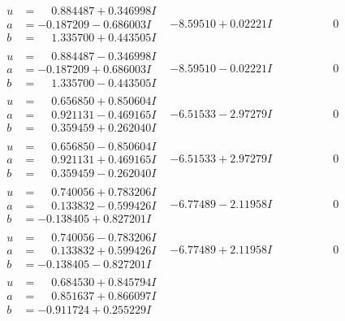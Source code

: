 \documentclass[1p]{elsarticle_modified}
\theoremstyle{definition}
\begin{document}
$$\begin{array}{c|c|c}
\begin{aligned}
u &= \phantom{-}0.884487 + 0.346998 I \\
a &= -0.187209 - 0.686003 I \\
b &= \phantom{-}1.335700 + 0.443505 I\end{aligned}
 & -8.59510 + 0.02221 I & \phantom{-0.000000 } 0 \\ \hline\begin{aligned}
u &= \phantom{-}0.884487 - 0.346998 I \\
a &= -0.187209 + 0.686003 I \\
b &= \phantom{-}1.335700 - 0.443505 I\end{aligned}
 & -8.59510 - 0.02221 I & \phantom{-0.000000 } 0 \\ \hline\begin{aligned}
u &= \phantom{-}0.656850 + 0.850604 I \\
a &= \phantom{-}0.921131 - 0.469165 I \\
b &= \phantom{-}0.359459 + 0.262040 I\end{aligned}
 & -6.51533 - 2.97279 I & \phantom{-0.000000 } 0 \\ \hline\begin{aligned}
u &= \phantom{-}0.656850 - 0.850604 I \\
a &= \phantom{-}0.921131 + 0.469165 I \\
b &= \phantom{-}0.359459 - 0.262040 I\end{aligned}
 & -6.51533 + 2.97279 I & \phantom{-0.000000 } 0 \\ \hline\begin{aligned}
u &= \phantom{-}0.740056 + 0.783206 I \\
a &= \phantom{-}0.133832 - 0.599426 I \\
b &= -0.138405 + 0.827201 I\end{aligned}
 & -6.77489 - 2.11958 I & \phantom{-0.000000 } 0 \\ \hline\begin{aligned}
u &= \phantom{-}0.740056 - 0.783206 I \\
a &= \phantom{-}0.133832 + 0.599426 I \\
b &= -0.138405 - 0.827201 I\end{aligned}
 & -6.77489 + 2.11958 I & \phantom{-0.000000 } 0 \\ \hline\begin{aligned}
u &= \phantom{-}0.684530 + 0.845794 I \\
a &= \phantom{-}0.851637 + 0.866097 I \\
b &= -0.911724 + 0.255229 I\end{aligned}

\end{array}$$
\end{document}
